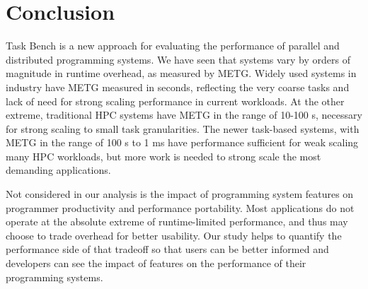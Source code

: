 \section{Conclusion}
\label{sec:conclusion}

Task Bench is a new approach for evaluating the performance
of parallel and distributed programming systems. We have seen that
systems vary by orders of magnitude in runtime overhead, as measured
by METG. Widely used systems in industry have METG measured in
seconds, reflecting the very coarse tasks and lack of need for strong
scaling performance in current workloads. At the other extreme,
traditional HPC systems have METG in the range of 10-100 \textmu{}s,
necessary for strong scaling to small task granularities. The newer
task-based systems, with METG in the range of 100 \textmu{}s to 1 ms
have performance sufficient for weak scaling many HPC workloads, but
more work is needed to strong scale the most demanding applications.

Not considered in our analysis is the impact of programming system
features on programmer productivity and performance portability. Most
applications do not operate at the absolute extreme of runtime-limited
performance, and thus may choose to trade overhead for better
usability. Our study helps to quantify the performance side of that
tradeoff so that users can be better informed and developers can see
the impact of features on the performance of their programming
systems.

